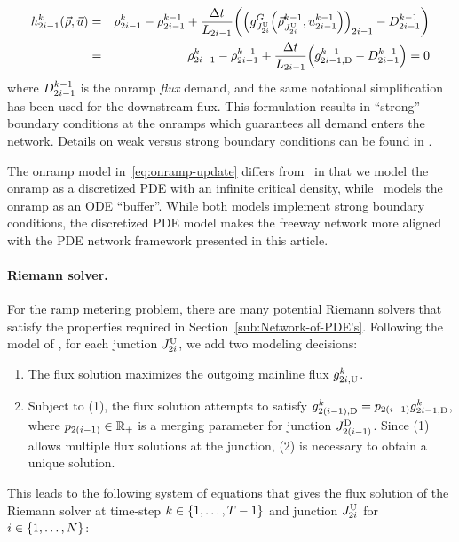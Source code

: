 			\begin{eqnarray}
				\syseq_{2\link-1}^{\tind}(\state,\control) & = & \discrete{2\link-1}{\tind}-\discrete{2\link-1}{\tind-1}+\frac{\Delta t}{\length_{2\link-1}}\left(\left(\god_{\jup{2\link}}\left(\juncstate{\jup{2\link}}{\tind-1},\ramp_{2\link-1}^{\tind-1}\right)\right)_{2\link-1}-\boundaryDemand{2\link-1}{\tind-1}\right)\label{eq:onramp-update}\\
				& = & \discrete{2\link-1}{\tind}-\discrete{2\link-1}{\tind-1}+\frac{\Delta t}{\length_{2\link-1}}\left(\fout{2\link-1}{\tind-1}-\boundaryDemand{2\link-1}{\tind-1}\right)=0
			\end{eqnarray}
			where $D_{2i-1}^{k-1}$ is the onramp \emph{flux
			}demand, and the same notational simplification has been used for
			the downstream flux. This formulation results in ``strong'' boundary
			conditions at the onramps which guarantees all demand enters the network.
			Details on weak versus strong boundary conditions can be found in
			\cite{Monache2013,Walid,strub2006weak,work2010traffic}.
			
			The onramp model in~\eqref{eq:onramp-update} differs from~\cite{Monache2013,Walid}
			in that we model the onramp as a discretized PDE with an infinite
			critical density, while~\cite{Monache2013,Walid} models the onramp
			as an ODE ``buffer''. While both models implement strong boundary
			conditions, the discretized PDE model makes the freeway network more
			aligned with the PDE network framework presented in this article.
			
			
			\paragraph{Riemann solver.}
			
			For the ramp metering problem, there are many potential Riemann solvers
			that satisfy the properties required in Section~\ref{sub:Network-of-PDE's}.
			Following the model of \cite{Walid,ML}, for each junction $J_{2i}^{\text{U}}$,
			we add two modeling decisions:
			\begin{enumerate}
				\item The flux solution maximizes the outgoing mainline flux $g_{2i,\text{U}}^{k}$.
				\item Subject to (1), the flux solution attempts to satisfy $\fout{2\left(\link-1\right)}{\tind}=p_{2(\link-1)}\fout{2\link-1}{\tind}$,
				where $p_{2(i-1)}\in\mathbb{R}_{+}$ is a merging parameter for
				junction $\jdown{2\left(\link-1\right)}$. Since (1) allows multiple
				flux solutions at the junction, (2) is necessary to obtain a unique
				solution.
			\end{enumerate}
			This leads to the following system of equations that gives the flux
			solution of the Riemann solver at time-step $k\in\intrange 1{\ntime-1}$
			and junction $J_{2i}^{\text{U}}$ for $\link\in\intrange 1{\nlinks}$:
			
